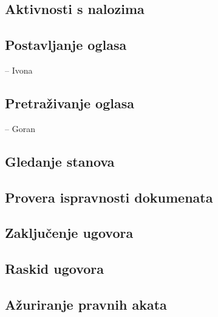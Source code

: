 \documentclass{article}
\begin{document}
\newpage
\subsection{\bfseries Aktivnosti s nalozima}

\newpage
\subsection{\bfseries Postavljanje oglasa}
-- Ivona

\newpage
\subsection{\bfseries Pretra\v{z}ivanje oglasa}
-- Goran 

\newpage
\subsection{\bfseries Gledanje stanova}

\newpage
\subsection{\bfseries Provera ispravnosti dokumenata}

\newpage
\subsection{\bfseries Zaklju\v{c}enje ugovora}

\newpage
\subsection{\bfseries Raskid ugovora}

\newpage
\subsection{\bfseries A\v{z}uriranje pravnih akata}
\end{document}
